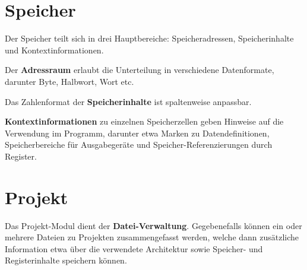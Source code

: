 \section{Speicher}

Der Speicher teilt sich in drei Hauptbereiche: Speicheradressen, Speicherinhalte
und Kontextinformationen.

Der \textbf{Adressraum} erlaubt die Unterteilung in verschiedene Datenformate,
darunter Byte, Halbwort, Wort etc.

Das Zahlenformat der \textbf{Speicherinhalte} ist spaltenweise anpassbar.

\textbf{Kontextinformationen} zu einzelnen Speicherzellen geben Hinweise auf die
Verwendung im Programm, darunter etwa Marken zu Datendefinitionen,
Speicherbereiche für Ausgabegeräte und Speicher-Referenzierungen durch Register.

\section{Projekt}

Das Projekt-Modul dient der \textbf{Datei-Verwaltung}. Gegebenefalls können ein
oder mehrere Dateien zu Projekten zusammengefasst werden, welche dann
zusätzliche Information etwa über die verwendete Architektur sowie Speicher- und
Registerinhalte speichern können.

